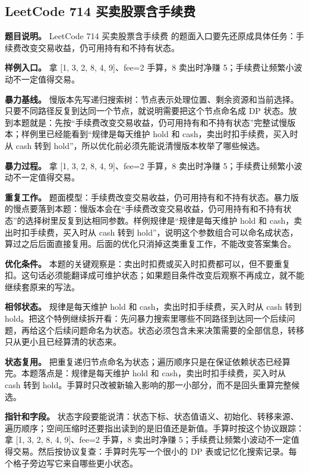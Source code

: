\subsection{LeetCode 714 买卖股票含手续费}

\textbf{题目说明。} LeetCode 714 买卖股票含手续费 的题面入口要先还原成具体任务：手续费改变交易收益，仍可用持有和不持有状态。

\textbf{样例入口。} 拿 [1, 3, 2, 8, 4, 9]、fee=2 手算，8 卖出时净赚 5；手续费让频繁小波动不一定值得交易。

\textbf{暴力基线。} 慢版本先写递归搜索树：节点表示处理位置、剩余资源和当前选择。只要不同路径反复到达同一个节点，就说明需要把这个节点命名成 DP 状态。放到本题就是：先按“手续费改变交易收益，仍可用持有和不持有状态”完整试慢版本；样例里已经能看到“规律是每天维护 hold 和 cash，卖出时扣手续费，买入时从 cash 转到 hold”，所以优化前必须先能说清慢版本枚举了哪些候选。

\textbf{暴力过程。} 拿 [1, 3, 2, 8, 4, 9]、fee=2 手算，8 卖出时净赚 5；手续费让频繁小波动不一定值得交易。

\textbf{重复工作。} 题面模型：手续费改变交易收益，仍可用持有和不持有状态。暴力版的慢点要落到本题：慢版本会在“手续费改变交易收益，仍可用持有和不持有状态”的选择树里反复到达相同参数。样例规律是“规律是每天维护 hold 和 cash，卖出时扣手续费，买入时从 cash 转到 hold”，说明这个参数组合可以命名成状态，算过之后后面直接复用。后面的优化只消掉这类重复工作，不能改变答案集合。

\textbf{优化条件。} 本题的关键观察是：卖出时扣费或买入时扣费都可以，但不要重复扣。这句话必须能翻译成可维护状态；如果题目条件改变后观察不再成立，就不能继续套原来的写法。

\textbf{相邻状态。} 规律是每天维护 hold 和 cash，卖出时扣手续费，买入时从 cash 转到 hold。把这个特例继续拆开看：先问暴力搜索里哪些不同路径到达同一个后续问题，再给这个后续问题命名为状态。状态必须包含未来决策需要的全部信息，转移只从更小且已经算清的状态来。

\textbf{状态复用。} 把重复递归节点命名为状态；遍历顺序只是在保证依赖状态已经算完。本题落点是：规律是每天维护 hold 和 cash，卖出时扣手续费，买入时从 cash 转到 hold。手算时只改被新输入影响的那一小部分，而不是回头重算完整候选。

\textbf{指针和字段。} 状态字段要能说清：状态下标、状态值语义、初始化、转移来源、遍历顺序；空间压缩时还要指出读到的是旧值还是新值。手算时按这个协议跟踪：拿 [1, 3, 2, 8, 4, 9]、fee=2 手算，8 卖出时净赚 5；手续费让频繁小波动不一定值得交易。然后按协议复查：手算时先写一个很小的 DP 表或记忆化搜索记录。每个格子旁边写它来自哪些更小状态。

